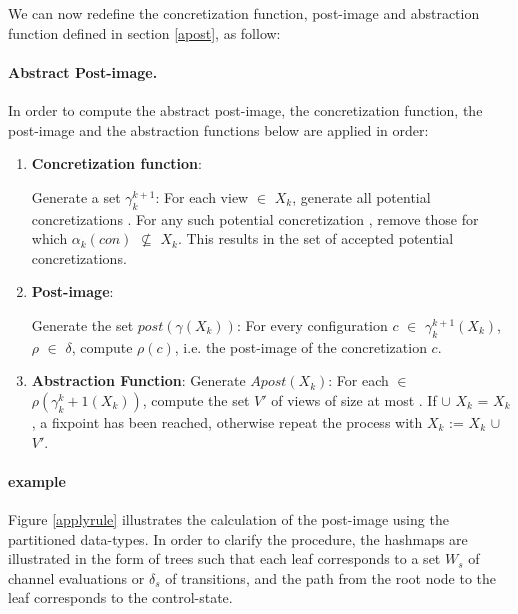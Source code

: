 We can now redefine the concretization function, post-image and abstraction function defined in section \ref{apost}, as follow:

\paragraph{Abstract Post-image.}
In order to compute the abstract post-image, the concretization function, the post-image and the abstraction functions below are applied in order:

\begin{enumerate}
\item
\textbf{Concretization function}:

Generate a set $\gamma_k^{k+1}$: For each view  $\in$ $X_k$, generate all potential concretizations . For any such potential concretization , remove those for which $\alpha_k(con)$ $\not\subseteq$ $X_k$. This results in the set of accepted potential concretizations.

\item
\textbf{Post-image}:

Generate the set $post(\gamma(X_k))$: For every configuration $c$ $\in$ $\gamma^{k+1}_k(X_k)$, $\rho$ $\in$ $\delta$, compute $\rho(c)$, i.e. the post-image of the concretization $c$.

\item
\textbf{Abstraction Function}:
Generate $Apost(X_k)$: For each  $\in$ $\rho(\gamma_k^k+1(X_k))$, compute the set $V'$ of views of size at most . If  $\cup$ $X_k$ = $X_k$, a fixpoint has been reached, otherwise repeat the process with $X_k$ := $X_k$ $\cup$ $V'$.
\end{enumerate}


\paragraph{example}
Figure \ref{applyrule} illustrates the calculation of the post-image using the partitioned data-types. In order to clarify the procedure, the hashmaps are illustrated in the form of trees such that each leaf corresponds to a set $W_s$ of channel evaluations or $\delta_s$ of transitions, and the path from the root node to the leaf corresponds to the control-state.

